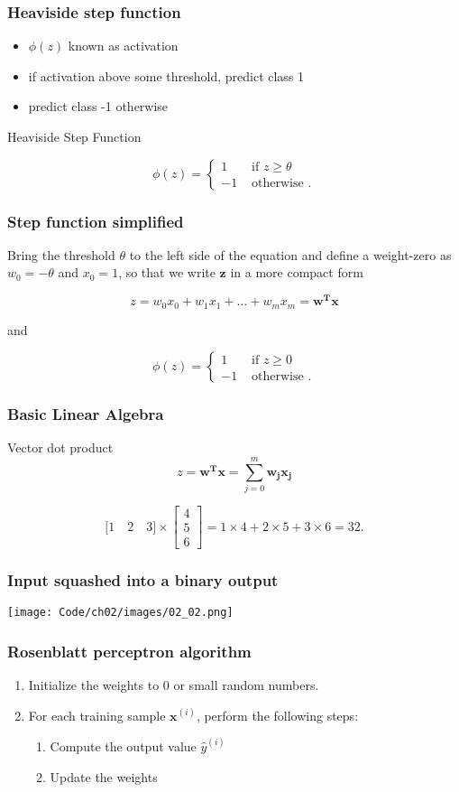 \documentclass{beamer}
\begin{document}
\begin{frame}
  \frametitle{Heaviside step function}
  \begin{itemize}
  \item $\phi(z)$ known as activation
  \item if activation above some threshold, predict class 1
  \item predict class -1 otherwise
  \end{itemize}
  Heaviside Step Function

  \[ \phi(z) = \begin{cases}
    1  & \text{ if } z \ge \theta \\
    -1 & \text{ otherwise }.
  \end{cases}
  \]
\end{frame}

\begin{frame}
\frametitle{Step function simplified}
Bring the threshold $\theta$ to the left side of the equation and define a weight-zero as $w_0 = -\theta$ and $x_0=1$, so that we write $\mathbf{z}$ in a more compact form

\[
z  = w_0 x_0 + w_1 x_1 + \dots + w_m x_m = \mathbf{w^T x}
\]

and

\[ \phi(z) = \begin{cases}
      1  & \text{ if } z \ge 0 \\
      -1 & \text{ otherwise }.
   \end{cases}
\]
\end{frame}

\begin{frame}
  \frametitle{Basic Linear Algebra}
  Vector dot product
  \[
  z  = \mathbf{w^T x} = \sum_{j=0}^{m} \mathbf{w_j} \mathbf{x_j}
  \]

  \[
  \big[1 \quad 2 \quad 3 \big] \times \begin{bmatrix}
    4  \\
    5  \\
    6
  \end{bmatrix} = 1 \times 4 + 2 \times 5 + 3 \times 6 = 32.
  \]
\end{frame}

\begin{frame}
  \frametitle{Input squashed into a binary output}
  \texttt{[image: Code/ch02/images/02\_02.png]}
\end{frame}

\begin{frame}
  \frametitle{Rosenblatt perceptron algorithm}
  \begin{enumerate}
  \item Initialize the weights to 0 or small random numbers.
  \item For each training sample $\mathbf{x}^{(i)}$, perform the following steps:
    \begin{enumerate}
    \item Compute the output value $\hat{y}^{(i)}$
    \item Update the weights
    \end{enumerate}
  \end{enumerate}
\end{frame}
\end{document}
